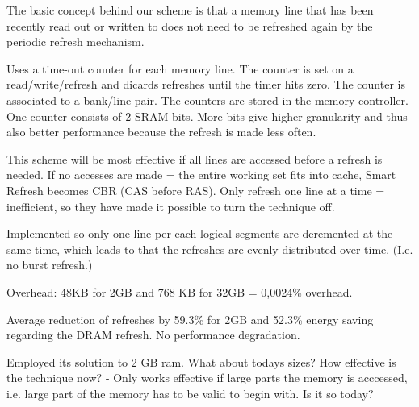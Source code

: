 The basic concept behind our scheme is that a memory line that has been recently read out or written to does not need to be refreshed again by the periodic refresh mechanism.

Uses a time-out counter for each memory line. The counter is set on a read/write/refresh and dicards refreshes until the timer hits zero. The counter is associated to a bank/line pair. The counters are stored in the memory controller. One counter consists of 2 SRAM bits. More bits give higher granularity and thus also better performance because the refresh is made less often.

This scheme will be most effective if all lines are accessed before a refresh is needed. If no accesses are made = the entire working set fits into cache, Smart Refresh becomes CBR (CAS before RAS). Only refresh one line at a time = inefficient, so they have made it possible to turn the technique off.

Implemented so only one line per each logical segments are deremented at the same time, which leads to that the refreshes are evenly distributed over time. (I.e. no burst refresh.)

Overhead: 48KB for 2GB and 768 KB for 32GB = 0,0024\% overhead. 

Average reduction of refreshes by 59.3\% for 2GB and 52.3\% energy saving regarding the DRAM refresh. No performance degradation.

Employed its solution to 2 GB ram. What about todays sizes? How effective is the technique now? - Only works effective if large parts the memory is acccessed, i.e. large part of the memory has to be valid to begin with. Is it so today?